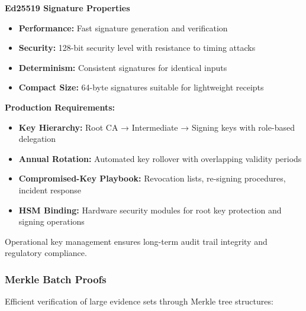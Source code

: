 \documentclass[12pt,a4paper]{article}
\begin{document}
\begin{technicalbox}
\textbf{Ed25519 Signature Properties}
\begin{itemize}
\item \textbf{Performance:} Fast signature generation and verification
\item \textbf{Security:} 128-bit security level with resistance to timing attacks
\item \textbf{Determinism:} Consistent signatures for identical inputs
\item \textbf{Compact Size:} 64-byte signatures suitable for lightweight receipts
\end{itemize}
\end{technicalbox}

\begin{tcolorbox}[colframe=red!50, colback=red!5, title={\textbf{Key Management (Operational)}}]
\textbf{Production Requirements:}
\begin{itemize}
\item \textbf{Key Hierarchy:} Root CA → Intermediate → Signing keys with role-based delegation
\item \textbf{Annual Rotation:} Automated key rollover with overlapping validity periods
\item \textbf{Compromised-Key Playbook:} Revocation lists, re-signing procedures, incident response
\item \textbf{HSM Binding:} Hardware security modules for root key protection and signing operations
\end{itemize}
Operational key management ensures long-term audit trail integrity and regulatory compliance.
\end{tcolorbox}

\subsubsection{Merkle Batch Proofs}

Efficient verification of large evidence sets through Merkle tree structures:
\end{document}
